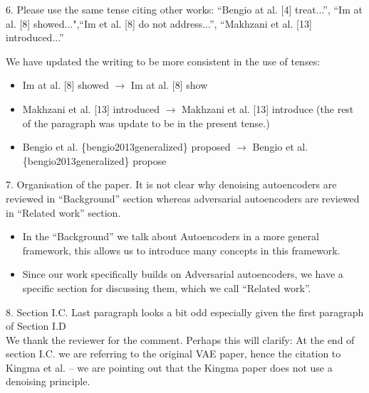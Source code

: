 \documentclass[a4paper,11pt]{article}
\begin{document}
{\color{blue}
6. Please use the same tense citing other works: ``Bengio at al. [4] treat...'', ``Im at al. [8] showed...",``Im et al. [8] do not address...'', ``Makhzani et al. [13] introduced...''}\\


{\color{red}
We have updated the writing to be more consistent in the use of tenses:
\begin{itemize}
    \item Im at al. [8] showed $\rightarrow$ Im at al. [8] show
    \item Makhzani et al. [13] introduced $\rightarrow$ Makhzani et al. [13] introduce (the rest of the paragraph was update to be in the present tense.)
    \item Bengio et al. \{bengio2013generalized\} proposed $\rightarrow$ Bengio et al. \{bengio2013generalized\} propose
\end{itemize}
}


{\color{blue}
7. Organisation of the paper. It is not clear why denoising autoencoders are reviewed in ``Background'' section whereas adversarial autoencoders are reviewed in ``Related work'' section.}\\

\begin{itemize}
    \item In the ``Background'' we talk about Autoencoders in a more general framework, this allows us to introduce many concepts in this framework.
    \item Since our work specifically builds on Adversarial autoencoders, we have a specific section for discussing them, which we call ``Related work''. 
\end{itemize}

{\color{blue}
8. Section I.C. Last paragraph looks a bit odd especially given the first paragraph of Section I.D}\\

We thank the reviewer for the comment.  Perhaps this will clarify: At the end of section I.C. we are referring to the original VAE paper, hence the citation to Kingma et al. -- we are pointing out that the Kingma paper does not use a denoising principle.\\
\end{document}
